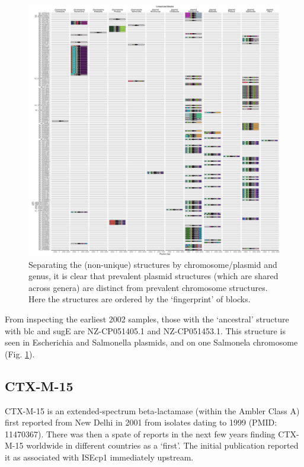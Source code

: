 \documentclass[aps,rmp,preprint,superscriptaddress,10pt,twocolumn]{revtex4-1}
\begin{document}
\begin{figure}
    \centering
\includegraphics[width=\linewidth]{figs/CMY-chromosome-plasmid.pdf}
    \caption{Separating the (non-unique) structures by chromosome/plasmid and genus, it is clear that prevalent plasmid structures (which are shared across genera) are distinct from prevalent chromosome structures. Here the structures are ordered by the `fingerprint' of blocks.}
    \label{fig:CMY-2-chromosome-plasmid}
\end{figure}

From inspecting the earliest 2002 samples, those with the `ancestral' structure with blc and sugE are NZ-CP051405.1 and NZ-CP051453.1. This structure is seen in Escherichia and Salmonella plasmids, and on one Salmonela chromosome (Fig. \ref{fig:CMY-2-chromosome-plasmid}).  

\subsection{CTX-M-15}

CTX-M-15 is an extended-spectrum beta-lactamase (within the Ambler Class A) first reported from New Delhi in 2001 from isolates dating to 1999 (PMID: 11470367). There was then a spate of reports in the next few years finding CTX-M-15 worldwide in different countries as a `first'. The initial publication reported it as associated with ISEcp1 immediately upstream. 
\end{document}
